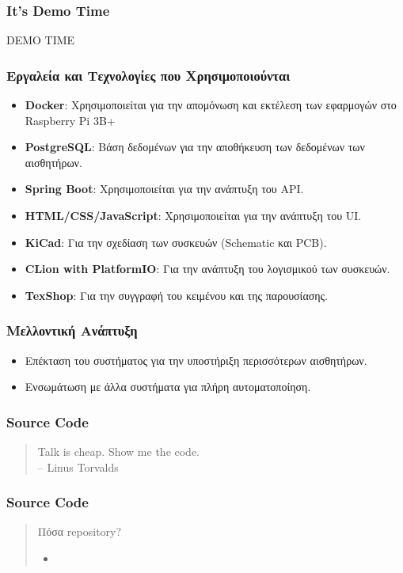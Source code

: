 \documentclass{beamer}
\begin{document}
\begin{frame}
\frametitle{It's Demo Time}
DEMO TIME
\end{frame}

\begin{frame}
\frametitle{Εργαλεία και Τεχνολογίες που Χρησιμοποιούνται}
\begin{itemize}
    \item \textbf{Docker}: Χρησιμοποιείται για την απομόνωση και εκτέλεση των εφαρμογών στο Raspberry Pi 3B+ 
    \item \textbf{PostgreSQL}: Βάση δεδομένων για την αποθήκευση των δεδομένων των αισθητήρων.
    \item \textbf{Spring Boot}: Χρησιμοποιείται για την ανάπτυξη του API.
    \item \textbf{HTML/CSS/JavaScript}: Χρησιμοποιείται για την ανάπτυξη του UI.
    \item \textbf{KiCad}: Για την σχεδίαση των συσκευών (Schematic και PCB).
    \item \textbf{CLion with PlatformIO}: Για την ανάπτυξη του λογισμικού των συσκευών.
    \item \textbf{TexShop}: Για την συγγραφή του κειμένου και της παρουσίασης.
\end{itemize}
\end{frame}

\begin{frame}
\frametitle{Μελλοντική Ανάπτυξη}
\begin{itemize}
    \item Επέκταση του συστήματος για την υποστήριξη περισσότερων αισθητήρων.
    \item Ενσωμάτωση με άλλα συστήματα για πλήρη αυτοματοποίηση.
\end{itemize}
\end{frame}

\begin{frame}
\frametitle{Source Code}
\begin{quote}
Talk is cheap. Show me the code.  
\\ \hfill -- Linus Torvalds
\end{quote}
\end{frame}

\begin{frame}
\frametitle{Source Code}
\begin{quote}
Πόσα repository?
\begin{itemize}
    \item 
\end{itemize}
\end{quote}
\end{frame}
\end{document}
